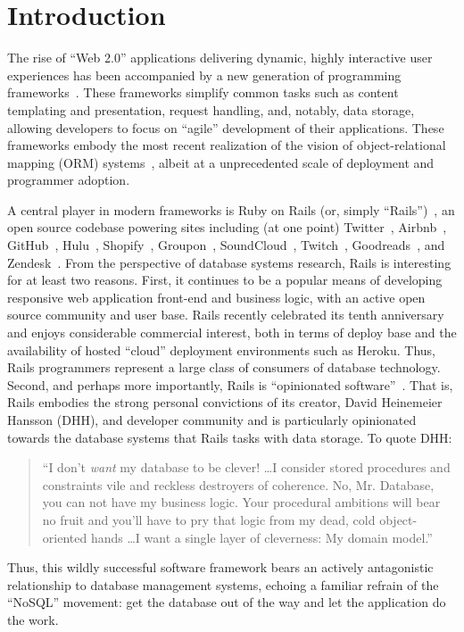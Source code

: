 
\section{Introduction}
\label{sec:intro}

The rise of ``Web 2.0'' applications delivering dynamic, highly
interactive user experiences has been accompanied by a new generation
of programming frameworks~\cite{web20}. These frameworks simplify
common tasks such as content templating and presentation, request
handling, and, notably, data storage, allowing developers to focus on
``agile'' development of their applications. These frameworks embody
the most recent realization of the vision of object-relational mapping
(ORM) systems~\cite{orm-db}, albeit at a unprecedented scale of deployment and
programmer adoption.

A central player in modern frameworks is Ruby on Rails (or, simply
``Rails'')~\cite{rails-book,rails-computer}, an open source codebase
powering sites including (at one point) Twitter~\cite{twitter-rails},
Airbnb~\cite{airbnb-rails}, GitHub~\cite{github-rails},
Hulu~\cite{hulu-rails}, Shopify~\cite{shopify-rails},
Groupon~\cite{groupon-rails}, SoundCloud~\cite{soundcloud-rails},
Twitch~\cite{twitch-rails}, Goodreads~\cite{goodreads-rails}, and
Zendesk~\cite{zendesk-rails}. From the perspective of database systems
research, Rails is interesting for at least two reasons. First, it
continues to be a popular means of developing responsive web
application front-end and business logic, with an active open source
community and user base. Rails recently celebrated its tenth
anniversary and enjoys considerable commercial interest, both in terms
of deploy base and the availability of hosted ``cloud'' deployment
environments such as Heroku. Thus, Rails programmers represent a large
class of consumers of database technology. Second, and perhaps more
importantly, Rails is ``opinionated
software''~\cite{dhh-opinionated}. That is, Rails embodies the strong
personal convictions of its creator, David Heinemeier Hansson (DHH),
and developer community and is particularly opinionated towards the
database systems that Rails tasks with data storage. To quote DHH:
\begin{quote}
``I don't \textit{want} my database to be clever! \dots I consider stored procedures and constraints vile and reckless destroyers of coherence. No, Mr. Database, you can not have my business logic. Your procedural ambitions will bear no fruit and you'll have to pry that logic from my dead, cold object-oriented hands \dots I want a single layer of cleverness: My domain model.''~\cite{dhh-clever}
\end{quote}
Thus, this wildly successful software framework bears an actively
antagonistic relationship to database management systems, echoing a familiar refrain of the ``NoSQL'' movement: get the database out of the way and let the application do the work.

